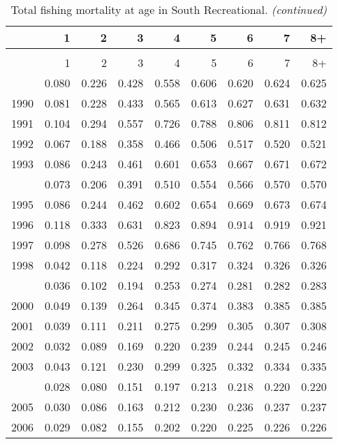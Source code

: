 \documentclass[
]{article}
\begin{document}
\begin{longtable}[t]{lrrrrrrrr}
\caption{\label{tab:South_Recreational-fleet-FAA-table}Total fishing mortality at age in South Recreational.}\\
\toprule
  & 1 & 2 & 3 & 4 & 5 & 6 & 7 & 8+\\
\midrule
\endfirsthead
\caption[]{Total fishing mortality at age in South Recreational. \textit{(continued)}}\\
\toprule
  & 1 & 2 & 3 & 4 & 5 & 6 & 7 & 8+\\
\midrule
\endhead

\endfoot
\bottomrule
\endlastfoot
1989 & 0.080 & 0.226 & 0.428 & 0.558 & 0.606 & 0.620 & 0.624 & 0.625\\
1990 & 0.081 & 0.228 & 0.433 & 0.565 & 0.613 & 0.627 & 0.631 & 0.632\\
1991 & 0.104 & 0.294 & 0.557 & 0.726 & 0.788 & 0.806 & 0.811 & 0.812\\
1992 & 0.067 & 0.188 & 0.358 & 0.466 & 0.506 & 0.517 & 0.520 & 0.521\\
1993 & 0.086 & 0.243 & 0.461 & 0.601 & 0.653 & 0.667 & 0.671 & 0.672\\
\addlinespace
1994 & 0.073 & 0.206 & 0.391 & 0.510 & 0.554 & 0.566 & 0.570 & 0.570\\
1995 & 0.086 & 0.244 & 0.462 & 0.602 & 0.654 & 0.669 & 0.673 & 0.674\\
1996 & 0.118 & 0.333 & 0.631 & 0.823 & 0.894 & 0.914 & 0.919 & 0.921\\
1997 & 0.098 & 0.278 & 0.526 & 0.686 & 0.745 & 0.762 & 0.766 & 0.768\\
1998 & 0.042 & 0.118 & 0.224 & 0.292 & 0.317 & 0.324 & 0.326 & 0.326\\
\addlinespace
1999 & 0.036 & 0.102 & 0.194 & 0.253 & 0.274 & 0.281 & 0.282 & 0.283\\
2000 & 0.049 & 0.139 & 0.264 & 0.345 & 0.374 & 0.383 & 0.385 & 0.385\\
2001 & 0.039 & 0.111 & 0.211 & 0.275 & 0.299 & 0.305 & 0.307 & 0.308\\
2002 & 0.032 & 0.089 & 0.169 & 0.220 & 0.239 & 0.244 & 0.245 & 0.246\\
2003 & 0.043 & 0.121 & 0.230 & 0.299 & 0.325 & 0.332 & 0.334 & 0.335\\
\addlinespace
2004 & 0.028 & 0.080 & 0.151 & 0.197 & 0.213 & 0.218 & 0.220 & 0.220\\
2005 & 0.030 & 0.086 & 0.163 & 0.212 & 0.230 & 0.236 & 0.237 & 0.237\\
2006 & 0.029 & 0.082 & 0.155 & 0.202 & 0.220 & 0.225 & 0.226 & 0.226\\

\end{longtable}
\end{document}

